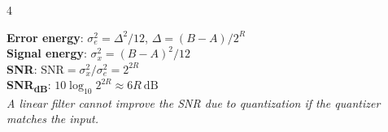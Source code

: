 \documentclass[8pt,a4paper,landscape]{extarticle}
\begin{document}
\begin{multicols*}{4}
\begin{prop}[title=Error analysis for uniform quantization]
\textbf{Error energy}: $\sigma_e^2 = \Delta^2/12$, \quad $\Delta = (B-A)/2^R$ \\
\textbf{Signal energy}: $\sigma_x^2 = (B-A)^2/12$ \\
\textbf{SNR}: $\mathrm{SNR} = \sigma_x^2/\sigma_e^2 = 2^{2R}$ \\
\textbf{SNR\textsubscript{dB}}: $10\log_{10} 2^{2R} \approx 6R\ \mathrm{dB}$ \\
\textit{A linear filter cannot improve the SNR due to quantization if the quantizer matches the input.}
\end{prop}

\end{multicols*}
\end{document}

